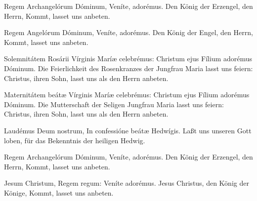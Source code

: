 \documentclass[fontsize=9pt,paper=A6,twoside,BCOR=1mm,DIV=22,headinclude]{scrarticle}
\begin{document}
\begin{paracol}{2}\pcb
	Regem Archangelórum Dóminum, \red{*} Veníte, adorémus.
	\switchcolumn 
	Den König der Erzengel, den Herrn, \red{*} Kommt, lasset uns anbeten.
\end{paracol}

\begin{paracol}{2}\pcb
	Regem Angelórum Dóminum, \red{*} Veníte, adorémus.
	\switchcolumn 
	Den König der Engel, den Herrn, \red{*} Kommt, lasset uns anbeten.
\end{paracol}

\begin{paracol}{2}\pcb
	Solemnitátem Rosárii Vírginis Maríæ celebrémus: \red{*} Christum ejus Fílium adorémus Dóminum.
	\switchcolumn 
	Die Feierlichkeit des Rosenkranzes der Jungfrau Maria lasst uns feiern: \red{*} Christus, ihren Sohn, lasst uns als den Herrn anbeten.
\end{paracol}

\begin{paracol}{2}\pcb
	Maternitátem beátæ Vírginis Maríæ celebrémus: \red{*} Christum ejus Fílium adorémus Dóminum.
	\switchcolumn 
	Die Mutterschaft der Seligen Jungfrau Maria lasst uns feiern: \red{*} Christus, ihren Sohn, lasst uns als den Herrn anbeten.
\end{paracol}

\pagebreak
{}
\begin{paracol}{2}\pcb
	Laudémus Deum nostrum, \red{*} In confessióne beátæ Hedwígis.
	\switchcolumn 
	Laßt uns unseren Gott loben, \red{*} für das Bekenntnis der heiligen Hedwig.
\end{paracol}

\begin{paracol}{2}\pcb
	Regem Archangelórum Dóminum, \red{*} Veníte, adorémus.
	\switchcolumn 
	Den König der Erzengel, den Herrn, \red{*} Kommt, lasset uns anbeten.
\end{paracol}

\begin{paracol}{2}\pcb
	Jesum Christum, Regem regum: \red{*} Veníte adorémus.
	\switchcolumn
	Jesus Christus, den König der Könige, \red{*} Kommt, lasset uns anbeten.
\end{paracol}
\end{document}
